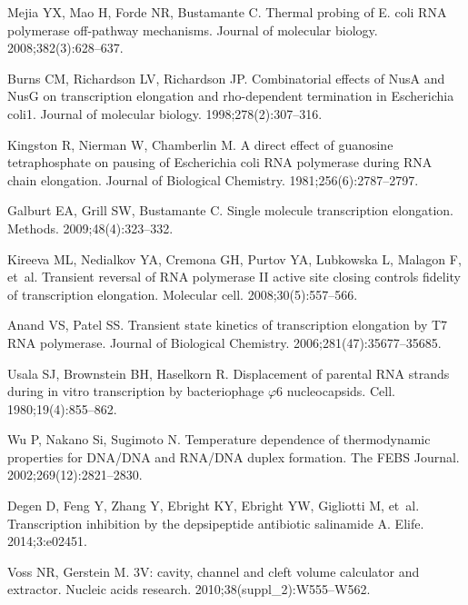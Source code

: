 \documentclass[10pt,letterpaper]{article}
\begin{document}
{{\begin{thebibliography}{10}
Mejia YX, Mao H, Forde NR, Bustamante C.
\newblock Thermal probing of E. coli RNA polymerase off-pathway mechanisms.
\newblock Journal of molecular biology. 2008;382(3):628--637.

Burns CM, Richardson LV, Richardson JP.
\newblock Combinatorial effects of NusA and NusG on transcription elongation
  and rho-dependent termination in Escherichia coli1.
\newblock Journal of molecular biology. 1998;278(2):307--316.

Kingston R, Nierman W, Chamberlin M.
\newblock A direct effect of guanosine tetraphosphate on pausing of Escherichia
  coli RNA polymerase during RNA chain elongation.
\newblock Journal of Biological Chemistry. 1981;256(6):2787--2797.

Galburt EA, Grill SW, Bustamante C.
\newblock Single molecule transcription elongation.
\newblock Methods. 2009;48(4):323--332.

Kireeva ML, Nedialkov YA, Cremona GH, Purtov YA, Lubkowska L, Malagon F, et~al.
\newblock Transient reversal of RNA polymerase II active site closing controls
  fidelity of transcription elongation.
\newblock Molecular cell. 2008;30(5):557--566.

Anand VS, Patel SS.
\newblock Transient state kinetics of transcription elongation by T7 RNA
  polymerase.
\newblock Journal of Biological Chemistry. 2006;281(47):35677--35685.

Usala SJ, Brownstein BH, Haselkorn R.
\newblock Displacement of parental RNA strands during in vitro transcription by
  bacteriophage $\varphi$6 nucleocapsids.
\newblock Cell. 1980;19(4):855--862.

Wu P, Nakano Si, Sugimoto N.
\newblock Temperature dependence of thermodynamic properties for DNA/DNA and
  RNA/DNA duplex formation.
\newblock The FEBS Journal. 2002;269(12):2821--2830.

Degen D, Feng Y, Zhang Y, Ebright KY, Ebright YW, Gigliotti M, et~al.
\newblock Transcription inhibition by the depsipeptide antibiotic salinamide A.
\newblock Elife. 2014;3:e02451.

Voss NR, Gerstein M.
\newblock 3V: cavity, channel and cleft volume calculator and extractor.
\newblock Nucleic acids research. 2010;38(suppl\_2):W555--W562.


\end{thebibliography}}}
\end{document}
